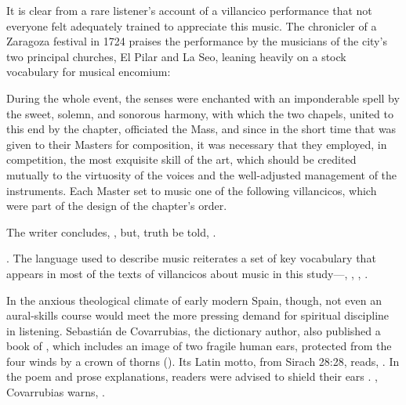 
It is clear from a rare listener's account of a villancico performance that not
everyone felt adequately trained to appreciate this music.
The chronicler of a Zaragoza festival in 1724 praises the performance by the
musicians of the city's two principal churches, El Pilar and La Seo, leaning
heavily on a stock vocabulary for musical encomium: 
\begin{quoting}
    During the whole event, the senses were enchanted with an imponderable
    spell by the sweet, solemn, and sonorous harmony, with which the two
    chapels, united to this end by the chapter, officiated the Mass, and since
    in the short time that was given to their Masters for composition, it was
    necessary that they employed, in competition, the most exquisite skill of
    the art, which should be credited mutually to the virtuosity of the voices
    and the well-adjusted management of the instruments.  
    Each Master set to music one of the following villancicos, which were part
    of the design of the chapter's order.
\end{quoting}
The writer concludes, , but, truth be told, .%
\begin{Footnote}
    \Autocite[97]{Zaragoza1724Relacion}.
    The language used to describe music reiterates a set of key vocabulary that
    appears in most of the texts of villancicos about music in this
    study---, ,
    , .
\end{Footnote}
In the anxious theological climate of early modern Spain, though, not even an
aural-skills course would meet the more pressing demand for spiritual discipline
in listening.
Sebastián de Covarrubias, the dictionary author, also published a book of
, which includes an image of two fragile human ears,
protected from the four winds by a crown of thorns
().%
    \Autocite[202]{Covarrubias:Emblemas}
Its Latin motto, from Sirach 28:28, reads, .
In the poem and prose explanations, readers were advised to shield their ears
.%
    \Autocite[203]{Covarrubias:Emblemas}
, Covarrubias warns, .%
    \Autocite[202]{Covarrubias:Emblemas}

